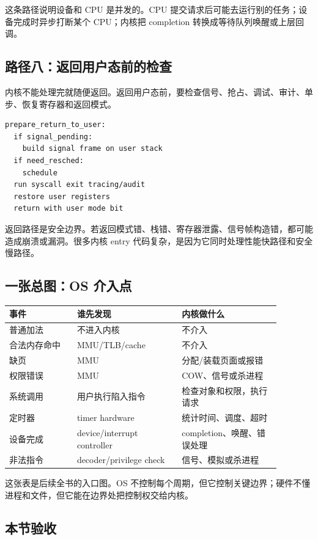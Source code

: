 这条路径说明设备和 CPU 是并发的。CPU 提交请求后可能去运行别的任务；设备完成时异步打断某个 CPU；内核把 completion 转换成等待队列唤醒或上层回调。

\subsection{路径八：返回用户态前的检查}

内核不能处理完就随便返回。返回用户态前，要检查信号、抢占、调试、审计、单步、恢复寄存器和返回模式。

\begin{lstlisting}
prepare_return_to_user:
  if signal_pending:
    build signal frame on user stack
  if need_resched:
    schedule
  run syscall exit tracing/audit
  restore user registers
  return with user mode bit
\end{lstlisting}

返回路径是安全边界。若返回模式错、栈错、寄存器泄露、信号帧构造错，都可能造成崩溃或漏洞。很多内核 entry 代码复杂，是因为它同时处理性能快路径和安全慢路径。

\subsection{一张总图：OS 介入点}

\begin{longtable}{p{0.22\linewidth}p{0.34\linewidth}p{0.32\linewidth}}
\toprule
事件 & 谁先发现 & 内核做什么 \\
\midrule
普通加法 & 不进入内核 & 不介入 \\
合法内存命中 & MMU/TLB/cache & 不介入 \\
缺页 & MMU & 分配/装载页面或报错 \\
权限错误 & MMU & COW、信号或杀进程 \\
系统调用 & 用户执行陷入指令 & 检查对象和权限，执行请求 \\
定时器 & timer hardware & 统计时间、调度、超时 \\
设备完成 & device/interrupt controller & completion、唤醒、错误处理 \\
非法指令 & decoder/privilege check & 信号、模拟或杀进程 \\
\bottomrule
\end{longtable}

这张表是后续全书的入口图。OS 不控制每个周期，但它控制关键边界；硬件不懂进程和文件，但它能在边界处把控制权交给内核。

\subsection{本节验收}

